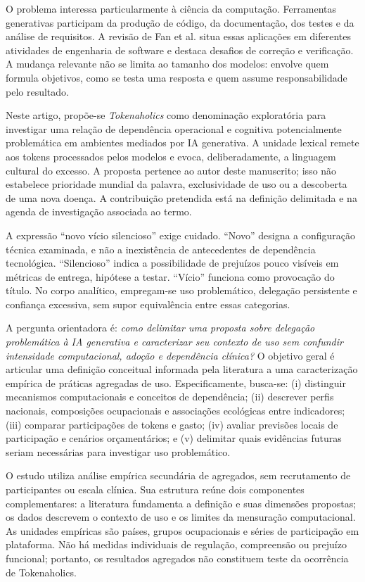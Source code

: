 \documentclass[11pt,a4paper]{article}
\begin{document}
O problema interessa particularmente à ciência da computação. Ferramentas generativas participam da produção de código, da documentação, dos testes e da análise de requisitos. A revisão de Fan et al. \cite{fan} situa essas aplicações em diferentes atividades de engenharia de software e destaca desafios de correção e verificação. A mudança relevante não se limita ao tamanho dos modelos: envolve quem formula objetivos, como se testa uma resposta e quem assume responsabilidade pelo resultado.

Neste artigo, propõe-se \textit{Tokenaholics} como denominação exploratória para investigar uma relação de dependência operacional e cognitiva potencialmente problemática em ambientes mediados por IA generativa. A unidade lexical remete aos tokens processados pelos modelos e evoca, deliberadamente, a linguagem cultural do excesso. A proposta pertence ao autor deste manuscrito; isso não estabelece prioridade mundial da palavra, exclusividade de uso ou a descoberta de uma nova doença. A contribuição pretendida está na definição delimitada e na agenda de investigação associada ao termo.

A expressão ``novo vício silencioso'' exige cuidado. ``Novo'' designa a configuração técnica examinada, e não a inexistência de antecedentes de dependência tecnológica. ``Silencioso'' indica a possibilidade de prejuízos pouco visíveis em métricas de entrega, hipótese a testar. ``Vício'' funciona como provocação do título. No corpo analítico, empregam-se uso problemático, delegação persistente e confiança excessiva, sem supor equivalência entre essas categorias.

A pergunta orientadora é: \textit{como delimitar uma proposta sobre delegação problemática à IA generativa e caracterizar seu contexto de uso sem confundir intensidade computacional, adoção e dependência clínica?} O objetivo geral é articular uma definição conceitual informada pela literatura a uma caracterização empírica de práticas agregadas de uso. Especificamente, busca-se: (i) distinguir mecanismos computacionais e conceitos de dependência; (ii) descrever perfis nacionais, composições ocupacionais e associações ecológicas entre indicadores; (iii) comparar participações de tokens e gasto; (iv) avaliar previsões locais de participação e cenários orçamentários; e (v) delimitar quais evidências futuras seriam necessárias para investigar uso problemático.

O estudo utiliza análise empírica secundária de agregados, sem recrutamento de participantes ou escala clínica. Sua estrutura reúne dois componentes complementares: a literatura fundamenta a definição e suas dimensões propostas; os dados descrevem o contexto de uso e os limites da mensuração computacional. As unidades empíricas são países, grupos ocupacionais e séries de participação em plataforma. Não há medidas individuais de regulação, compreensão ou prejuízo funcional; portanto, os resultados agregados não constituem teste da ocorrência de Tokenaholics.
\end{document}
